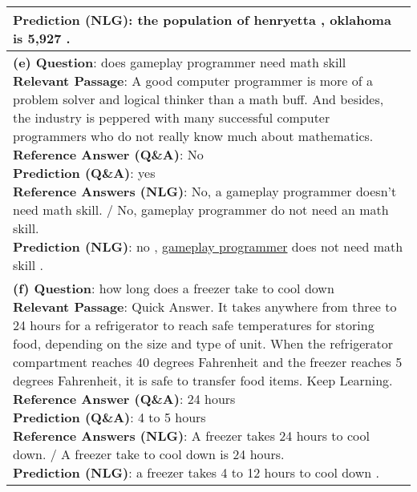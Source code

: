 \documentclass[11pt,a4paper]{article}
\newcommand{\cmark}{\ding{51}}
\newcommand{\xmark}{\ding{55}}
\theoremstyle{mydef}
\theoremstyle{myprob}
\begin{document}
\begin{table*}[h!]
{\begin{tabular}{p{50em}}
{\textbf{Prediction (NLG)}:  the population of henryetta , oklahoma is 5,927 . \cmark
}
\vspace{1pt}
\\ \hline
\vspace{0.5pt}
\pbox{50em}{
\textbf{(e) Question}: does gameplay programmer need math skill\\
\textbf{Relevant Passage}: A good computer programmer is more of a problem solver and logical thinker than a math buff. And besides, the industry is peppered with many successful computer programmers who do not really know much about mathematics. \\
\textbf{Reference Answer (Q\&A)}: No \\
\textbf{Prediction (Q\&A)}: yes \xmark \\
\textbf{Reference Answers (NLG)}: No, a gameplay programmer doesn't need math skill. / No, gameplay programmer do not need an math skill.\\
\textbf{Prediction (NLG)}: no , \underline{gameplay programmer} does not need math skill . \cmark
}
\vspace{1pt}
\\ \hline
\vspace{0.5pt}
\pbox{50em}{
\textbf{(f) Question}: how long does a freezer take to cool down\\
\textbf{Relevant Passage}: Quick Answer. It takes anywhere from three to 24 hours for a refrigerator to reach safe temperatures for storing food, depending on the size and type of unit. When the refrigerator compartment reaches 40 degrees Fahrenheit and the freezer reaches 5 degrees Fahrenheit, it is safe to transfer food items. Keep Learning. \\
\textbf{Reference Answer (Q\&A)}: 24 hours\\
\textbf{Prediction (Q\&A)}: 4 to 5 hours \xmark \\
\textbf{Reference Answers (NLG)}: A freezer takes 24 hours to cool down. / A  freezer take to cool down is 24 hours.\\
\textbf{Prediction (NLG)}: a freezer takes 4 to 12 hours to cool down . \xmark
}
\vspace{1pt}
\\ \hline
\end{tabular}
}
\end{table*}
\end{document}
